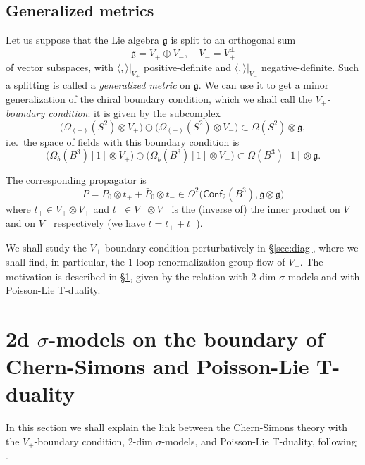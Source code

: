 \documentclass[a4paper]{amsart}
\theoremstyle{plain}
\theoremstyle{definition}
\newcommand{\g}{\mathfrak{g}}
\newcommand{\la}{\langle}
\newcommand{\ra}{\rangle}
\newcommand{\cf}{\mathsf{Conf}}
\begin{document}
\subsection{Generalized metrics}\label{sec:gm}
Let us suppose that the Lie algebra $\g$ is split to an orthogonal sum
$$\g=V_+\oplus V_-,\quad V_-=V_+^\perp$$
of vector subspaces, with $\la,\ra|_{V_+}$ positive-definite and $\la,\ra|_{V_-}$ negative-definite. Such a splitting is called a \emph{generalized metric} on $\g$. We can use it to get  a minor generalization of the chiral boundary condition, which we shall call the \emph{$V_+$-boundary condition}: it is given by the subcomplex
$$\bigl(\Omega_{(+)}(S^2)\otimes V_+\bigr) \oplus \bigl(\Omega_{(-)}(S^2)\otimes V_-\bigr) \subset\Omega(S^2)\otimes\g,$$
i.e.\ the  space of fields with this boundary condition is
$$\bigl(\Omega_{b}(B^3)[1]\otimes V_+\bigr) \oplus \bigl(\Omega_{\bar b}(B^3)[1]\otimes V_-\bigr)\subset \Omega(B^3)[1]\otimes\g.
$$

The corresponding propagator is
\begin{equation}\label{gmprop}
P=P_0\otimes t_+ + \bar P_0\otimes t_-\in \Omega^2\bigl(\cf_2(B^3),\g\otimes\g\bigr)
\end{equation}
where $t_+\in V_+\otimes V_+$ and $t_-\in V_-\otimes V_-$ is the (inverse of) the inner product on $V_+$ and on $V_-$ respectively (we have $t = t_+ + t_-$).

We shall study the $V_+$-boundary condition perturbatively in \S\ref{sec:diag}, where we shall find, in particular, the 1-loop renormalization group flow of $V_+$. The motivation is described in \S\ref{sec:PL}, given by the relation with 2-dim $\sigma$-models and with Poisson-Lie T-duality.


\section{2d $\sigma$-models on the boundary of Chern-Simons and Poisson-Lie T-duality}\label{sec:PL}

In this section we shall explain the link between the Chern-Simons theory with the $V_+$-boundary condition, 2-dim $\sigma$-models, and Poisson-Lie T-duality, following \cite{S, PSV}.
\end{document}
